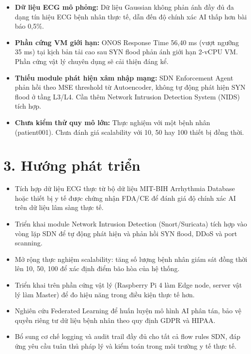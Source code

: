 \begin{itemize}
    \item \textbf{Dữ liệu ECG mô phỏng:} Dữ liệu Gaussian không phản ánh đầy đủ đa dạng tín hiệu ECG bệnh nhân thực tế, dẫn đến độ chính xác AI thấp hơn bài báo 0,5\%.

    \item \textbf{Phần cứng VM giới hạn:} ONOS Response Time 56,40 ms (vượt ngưỡng 35 ms) tại kịch bản tải cao sau SYN flood phản ánh giới hạn 2-vCPU VM. Phần cứng vật lý chuyên dụng sẽ cải thiện đáng kể.

    \item \textbf{Thiếu module phát hiện xâm nhập mạng:} SDN Enforcement Agent phản hồi theo MSE threshold từ Autoencoder, không tự động phát hiện SYN flood ở tầng L3/L4. Cần thêm Network Intrusion Detection System (NIDS) tích hợp.

    \item \textbf{Chưa kiểm thử quy mô lớn:} Thực nghiệm với một bệnh nhân (patient001). Chưa đánh giá scalability với 10, 50 hay 100 thiết bị đồng thời.
\end{itemize}

\section*{3. Hướng phát triển}

\begin{itemize}
    \item Tích hợp dữ liệu ECG thực từ bộ dữ liệu MIT-BIH Arrhythmia Database hoặc thiết bị y tế được chứng nhận FDA/CE để đánh giá độ chính xác AI trên dữ liệu lâm sàng thực tế.

    \item Triển khai module Network Intrusion Detection (Snort/Suricata) tích hợp vào vòng lặp SDN để tự động phát hiện và phản hồi SYN flood, DDoS và port scanning.

    \item Mở rộng thực nghiệm scalability: tăng số lượng bệnh nhân giám sát đồng thời lên 10, 50, 100 để xác định điểm bão hòa của hệ thống.

    \item Triển khai trên phần cứng vật lý (Raspberry Pi 4 làm Edge node, server vật lý làm Master) để đo hiệu năng trong điều kiện thực tế hơn.

    \item Nghiên cứu Federated Learning để huấn luyện mô hình AI phân tán, bảo vệ quyền riêng tư dữ liệu bệnh nhân theo quy định GDPR và HIPAA.

    \item Bổ sung cơ chế logging và audit trail đầy đủ cho tất cả flow rules SDN, đáp ứng yêu cầu tuân thủ pháp lý và kiểm toán trong môi trường y tế thực tế.
\end{itemize}
